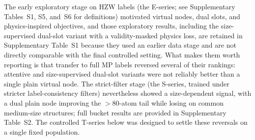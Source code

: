 \documentclass[a4paper,11pt]{article}
\begin{document}
The early exploratory stage on HZW labels (the E-series; see Supplementary Tables~S1, S5, and~S6 for definitions) motivated virtual nodes, dual slots, and physics-inspired objectives, and those exploratory results, including the size-supervised dual-slot variant with a validity-masked physics loss, are retained in Supplementary Table~S1 because they used an earlier data stage and are not directly comparable with the final controlled setting. What makes them worth reporting is that transfer to full MP labels reversed several of their rankings: attentive and size-supervised dual-slot variants were not reliably better than a single plain virtual node. The strict-filter stage (the S-series, trained under stricter label-consistency filters) nevertheless showed a size-dependent signal, with a dual plain node improving the \(>80\)-atom tail while losing on common medium-size structures; full bucket results are provided in Supplementary Table~S2. The controlled T-series below was designed to settle these reversals on a single fixed population.
\end{document}
